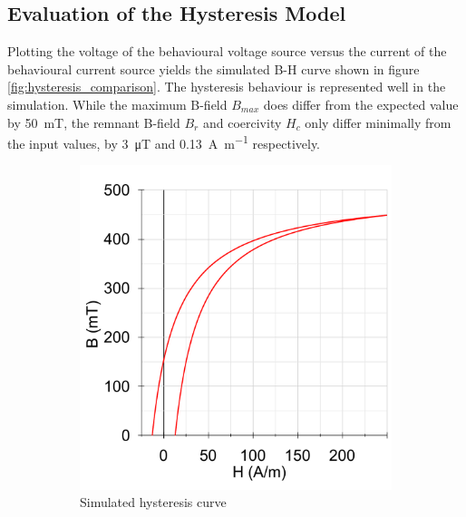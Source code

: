 \subsection{Evaluation of the Hysteresis Model}
Plotting the voltage of the behavioural voltage source versus the current of the behavioural current source yields the simulated B-H curve shown in figure \ref{fig:hysteresis_comparison}. The hysteresis behaviour is represented well in the simulation. While the maximum B-field $B_{max}$ does differ from the expected value by \SI{50}{\milli\tesla}, the remnant B-field $B_r$ and coercivity $H_c$ only differ minimally from the input values, by \SI{3}{\micro\tesla} and \SI{0.13}{\A\per\m} respectively.
\begin{figure}[H]
    \begin{subfigure}[b]{0.50\textwidth}
        \includegraphics[width=\textwidth]{Bilder/Kapitel3/Hysteresis_LTspice_2.pdf}
        \caption{Simulated hysteresis curve}
    \end{subfigure}
    \begin{subfigure}[b]{0.49\textwidth}

\end{subfigure}
\end{figure}
